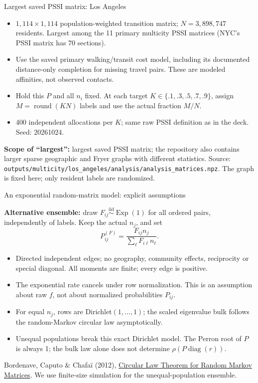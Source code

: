 \documentclass[aspectratio=169,10pt]{beamer}
\begin{document}
\begin{frame}{Largest saved PSSI matrix: Los Angeles}
\small

\begin{itemize}
\item $1{,}114\times1{,}114$ population-weighted transition matrix; $N=3{,}898{,}747$ residents. Largest among the 11 primary multicity PSSI matrices (NYC's PSSI matrix has 70 sections).
\item Use the saved primary walking/transit cost model, including its documented distance-only completion for missing travel pairs. These are modeled affinities, not observed contacts.
\item Hold this $P$ and all $n_i$ fixed. At each target $K\in\{.1,.3,.5,.7,.9\}$, assign $M=\operatorname{round}(KN)$ labels and use the actual fraction $M/N$.
\item 400 independent allocations per $K$; same raw PSSI definition as in the deck. Seed: 20261024.
\end{itemize}
\medskip
\textbf{Scope of ``largest'':} largest saved PSSI matrix; the repository also contains larger sparse geographic and Fryer graphs with different statistics.
\medskip
\footnotesize Source: \texttt{outputs/multicity/los\_angeles/analysis/analysis\_matrices.npz}. The graph is fixed here; only resident labels are randomized.

\end{frame}

\begin{frame}{An exponential random-matrix model: explicit assumptions}
\small

\textbf{Alternative ensemble:} draw $F_{ij}\overset{\mathrm{iid}}\sim\operatorname{Exp}(1)$ for all ordered pairs, independently of labels. Keep the actual $n_j$, and set
\[
 P^{(F)}_{ij}=\frac{F_{ij}n_j}{\sum_\ell F_{i\ell}n_\ell}.
\]
\begin{itemize}
\item Directed independent edges; no geography, community effects, reciprocity or special diagonal. All moments are finite; every edge is positive.
\item The exponential rate cancels under row normalization. This is an assumption about raw $f$, not about normalized probabilities $P_{ij}$.
\item For equal $n_j$, rows are Dirichlet$(1,\ldots,1)$; the scaled eigenvalue bulk follows the random-Markov circular law asymptotically.
\item Unequal populations break this exact Dirichlet model. The Perron root of $P$ is always 1; the bulk law alone does not determine $\rho(P\operatorname{diag}(r))$.
\end{itemize}
\footnotesize Bordenave, Caputo \& Chafa\"i (2012), \href{https://arxiv.org/abs/0808.1502}{Circular Law Theorem for Random Markov Matrices}. We use finite-size simulation for the unequal-population ensemble.

\end{frame}
\end{document}
